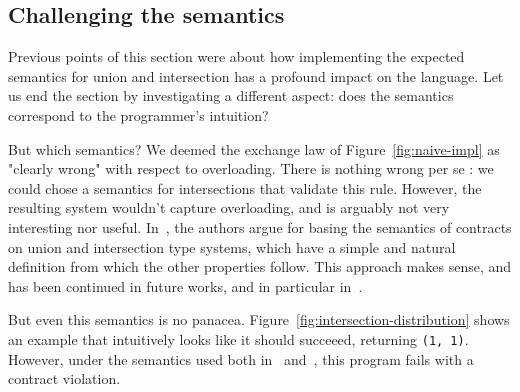 \documentclass[sigplan,10pt,review,anonymous]{acmart}
\newcommand{\nickel}[1]{\lstinline[language=nickel]{#1}}
\begin{document}
\subsection{Challenging the semantics}


Previous points of this section were about how implementing the expected
semantics for union and intersection has a profound impact on the language. Let
us end the section by investigating a different aspect: does the
semantics correspond to the programmer's intuition?

But which semantics? We deemed the exchange law of Figure~\ref{fig:naive-impl}
as "clearly wrong" with respect to overloading. There is nothing wrong per se :
we could chose a semantics for intersections that validate this rule.  However,
the resulting system wouldn't capture overloading, and is arguably not very
interesting nor useful. In~\cite{KeilThiemannUnionIntersection}, the authors
argue for basing the semantics of contracts on union and intersection type
systems, which have a simple and natural definition from which the other
properties follow. This approach makes sense, and has been continued in future
works, and in particular in~\cite{RootCauseOfBlame}.

But even this semantics is no panacea. Figure~\ref{fig:intersection-distribution}
shows an example that intuitively looks like it should succeeed, returning
\nickel{(1, 1)}. However, under the semantics used both
in~\cite{KeilThiemannUnionIntersection} and~\cite{RootCauseOfBlame}, this program
fails with a contract violation.

%
%
%
\end{document}
